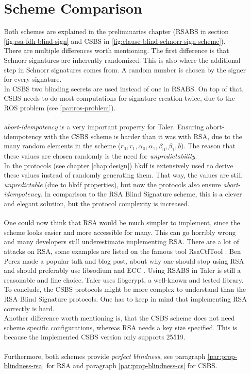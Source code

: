 \section{Scheme Comparison}
\label{chap:disc-scheme-comp}
Both schemes are explained in the preliminaries chapter (\gls{RSABS} in section \ref{fig:rsa-fdh-blind-sign} and \gls{CSBS} in \ref{fig:clause-blind-schnorr-sign-scheme}).
\\
There are multiple differences worth mentioning.
The first difference is that Schnorr signatures are inherently randomized.
This is also where the additional step in Schnorr signatures comes from.
A random number is chosen by the signer for every signature. \\
In \gls{CSBS} two blinding secrets are used instead of one in \gls{RSABS}.
On top of that, \gls{CSBS} needs to do most computations for signature creation twice, due to the \ac{ROS} problem (see \ref{par:ros-problem}).
\\\\
\textit{\Gls{abort-idempotency}} is a very important property for Taler.
Ensuring \gls{abort-idempotency} with the \gls{CSBS} scheme is harder than it was with RSA, due to the many random elements in the scheme ($r_0, r_1, \alpha_0, \alpha_1, \beta_0, \beta_1, b$).
The reason that these values are chosen randomly is the need for \textit{unpredictability}.\\
In the protocols (see chapter \ref{chap:design}) \gls{hkdf} is extensively used to derive these values instead of randomly generating them.
That way, the values are still \textit{unpredictable} (due to \gls{hkdf} properties), but now the protocols also ensure \textit{\gls{abort-idempotency}}.
In comparison to the RSA Blind Signature scheme, this is a clever and elegant solution, but the protocol complexity is increased.
\\\\
One could now think that RSA would be much simpler to implement, since the scheme looks easier and more accessible for many.
This can go horribly wrong and many developers still underestimate implementing RSA.
There are a lot of attacks on RSA, some examples are listed on the famous tool RsaCtfTool \cite{ganapati:rsactftool}.
Ben Perez made a popular talk and blog post, about why one should stop using RSA and should preferably use libsodium and \ac{ECC} \cite{perez:stoprsa}.
Using \gls{RSABS} in Taler is still a reasonable and fine choice.
Taler uses libgcrypt, a well-known and tested library.
\\
To conclude, the \gls{CSBS} protocols might be more complex to understand than the RSA Blind Signature protocols.
One has to keep in mind that implementing RSA correctly is hard.
\\
Another difference worth mentioning is, that the \gls{CSBS} scheme does not need scheme specific configurations, whereas RSA needs a key size specified.
This is because the implemented \gls{CSBS} version only supports \gls{25519}.
\\\\
Furthermore, both schemes provide \textit{perfect blindness}, see paragraph \ref{par:prop-blindness-rsa} for RSA and paragraph \ref{par:prop-blindness-cs} for \gls{CSBS}.


